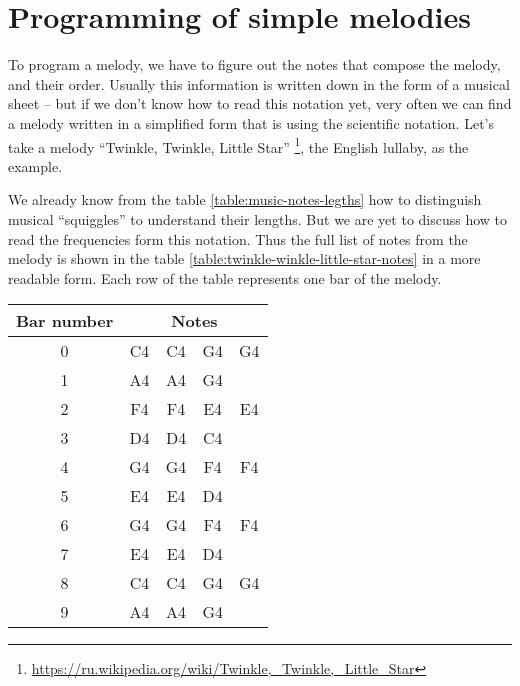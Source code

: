 \documentclass[../sparc.tex]{subfiles}
\begin{document}
\section{Programming of simple melodies}

To program a melody, we have to figure out the notes that compose the melody,
and their order.  Usually this information is written down in the form of a
musical sheet -- but if we don't know how to read this notation yet, very often
we can find a melody written in a simplified form that is using the scientific
notation.  Let's take a melody ``Twinkle, Twinkle, Little
Star'' \footnote{\url{https://ru.wikipedia.org/wiki/Twinkle,_Twinkle,_Little_Star}}, the English lullaby, as the example.


We already know from the table \ref{table:music-notes-legths} how to distinguish
musical ``squiggles'' to understand their lengths.  But we are yet to discuss
how to read the frequencies form this notation.  Thus the full list of notes
from the melody is shown in the table
\ref{table:twinkle-winkle-little-star-notes} in a more readable form.  Each row
of the table represents one bar of the melody.

\begin{table}[ht]
  \centering
  \begin{tabular}{|*{5}{c|}}
    \hline
    \textbf{Bar number} & \multicolumn{4}{c|}{\textbf{Notes}} \\
    \hline
    0 & C4 & C4 & G4 & G4 \\
    \hline
    1 & A4 & A4 & G4 & \\
    \hline
    2 & F4 & F4 & E4 & E4 \\
    \hline
    3 & D4 & D4 & C4 & \\
    \hline
    4 & G4 & G4 & F4 & F4 \\
    \hline
    5 & E4 & E4 & D4 & \\
    \hline
    6 & G4 & G4 & F4 & F4 \\
    \hline
    7 & E4 & E4 & D4 & \\
    \hline
    8 & C4 & C4 & G4 & G4 \\
    \hline
    9 & A4 & A4 & G4 & \\
    \hline
  \end{tabular}
  \label{table:twinkle-twinkle-little-star-notes}
\end{table}
\end{document}
